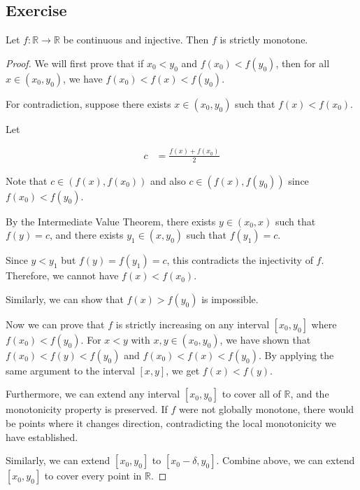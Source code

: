 \subsection{Exercise}

\begin{exercise}
    Let $f: \mathbb{R} \to \mathbb{R}$ be continuous and injective. Then $f$ is strictly monotone.
\end{exercise}

\begin{proof}
    We will first prove that if $x_0 < y_0$ and $f(x_0) < f(y_0)$, then for all $x \in (x_0, y_0)$, we have $f(x_0) < f(x) < f(y_0)$.

    For contradiction, suppose there exists $x \in (x_0, y_0)$ such that $f(x) < f(x_0)$.

    Let

    \begin{align*}
        c &= \frac{f(x) + f(x_0)}{2}
    \end{align*}

    Note that $c \in (f(x), f(x_0))$ and also $c \in (f(x), f(y_0))$ since $f(x_0) < f(y_0)$.

    By the Intermediate Value Theorem, there exists $y \in (x_0, x)$ such that $f(y) = c$,
    and there exists $y_1 \in (x, y_0)$ such that $f(y_1) = c$.

    Since $y < y_1$ but $f(y) = f(y_1) = c$, this contradicts the injectivity of $f$.
    Therefore, we cannot have $f(x) < f(x_0)$.

    Similarly, we can show that $f(x) > f(y_0)$ is impossible.

    Now we can prove that $f$ is strictly increasing on any interval $[x_0, y_0]$ where $f(x_0) < f(y_0)$. 
    For $x < y$ with $x,y \in (x_0, y_0)$, we have shown that $f(x_0) < f(y) < f(y_0)$ and $f(x_0) < f(x) < f(y_0)$.
    By applying the same argument to the interval $[x, y]$, we get $f(x) < f(y)$.

    Furthermore, we can extend any interval $[x_0, y_0]$ to cover all of $\mathbb{R}$, and the monotonicity property is preserved.
    If $f$ were not globally monotone, there would be points where it changes direction, contradicting the local monotonicity we have established. 

    Similarly, we can extend $[x_0, y_0]$ to $[x_0 - \delta, y_0]$. Combine above, we can extend $[x_0, y_0]$
    to cover every point in $\mathbb{R}$.


\end{proof}

